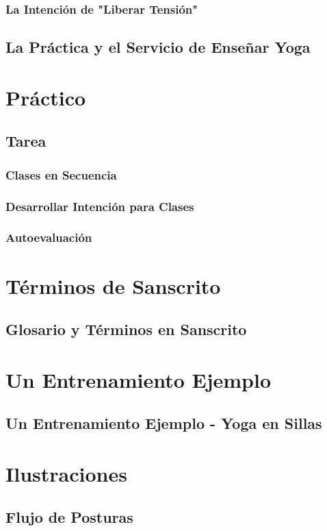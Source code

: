 \documentclass[a4paper]{book}
\begin{document}
\subsubsection{La Intención de "Liberar Tensión"}
\subsection{La Práctica y el Servicio de Enseñar Yoga}

\section{Práctico}
\subsection{Tarea}
\subsubsection{Clases en Secuencia}
\subsubsection{Desarrollar Intención para Clases}
\subsubsection{Autoevaluación}

\section{Términos de Sanscrito}
\subsection{Glosario y Términos en Sanscrito}

\section{Un Entrenamiento Ejemplo}
\subsection{Un Entrenamiento Ejemplo - Yoga en Sillas}

\section{Ilustraciones}
\subsection{Flujo de Posturas}
\end{document}

